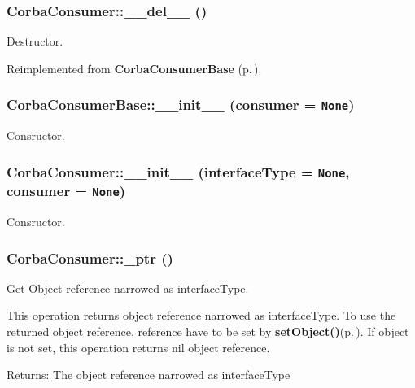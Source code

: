 \subsubsection{\setlength{\rightskip}{0pt plus 5cm}Corba\-Consumer::\_\-\_\-del\_\-\_\- ()}\label{classCorbaConsumer_CorbaConsumera2}


Destructor. 



Reimplemented from {\bf Corba\-Consumer\-Base} {\rm (p.\,\pageref{classCorbaConsumerBase_CorbaConsumerBasea2})}.
\subsubsection{\setlength{\rightskip}{0pt plus 5cm}Corba\-Consumer\-Base::\_\-\_\-init\_\-\_\- (consumer = {\tt None})\hspace{0.3cm}{\tt  [inherited]}}\label{classCorbaConsumerBase_CorbaConsumerBasea0}


Consructor. 

\subsubsection{\setlength{\rightskip}{0pt plus 5cm}Corba\-Consumer::\_\-\_\-init\_\-\_\- (interface\-Type = {\tt None}, consumer = {\tt None})}\label{classCorbaConsumer_CorbaConsumera0}


Consructor. 

\subsubsection{\setlength{\rightskip}{0pt plus 5cm}Corba\-Consumer::\_\-ptr ()}\label{classCorbaConsumer_CorbaConsumera4}


Get Object reference narrowed as interface\-Type. 

This operation returns object reference narrowed as interface\-Type. To use the returned object reference, reference have to be set by {\bf set\-Object()}{\rm (p.\,\pageref{classCorbaConsumer_CorbaConsumera3})}. If object is not set, this operation returns nil object reference. \begin{Desc}
\item[Returns:]The object reference narrowed as interface\-Type\end{Desc}
